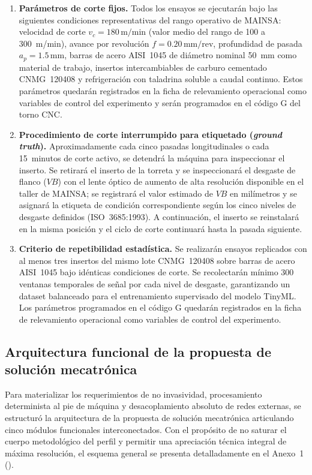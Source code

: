 \begin{enumerate}[leftmargin=0.8cm]
    \item \textbf{Parámetros de corte fijos.} Todos los ensayos se ejecutarán bajo las siguientes condiciones representativas del rango operativo de MAINSA: velocidad de corte $v_c = 180\,\text{m/min}$ (valor medio del rango de 100 a 300~m/min), avance por revolución $f = 0.20\,\text{mm/rev}$, profundidad de pasada $a_p = 1.5\,\text{mm}$, barras de acero AISI~1045 de diámetro nominal 50~mm como material de trabajo, insertos intercambiables de carburo cementado CNMG~120408 y refrigeración con taladrina soluble a caudal continuo. Estos parámetros quedarán registrados en la ficha de relevamiento operacional como variables de control del experimento y serán programados en el código G del torno CNC.

    \item \textbf{Procedimiento de corte interrumpido para etiquetado (\textit{ground truth}).} Aproximadamente cada cinco pasadas longitudinales o cada 15~minutos de corte activo, se detendrá la máquina para inspeccionar el inserto. Se retirará el inserto de la torreta y se inspeccionará el desgaste de flanco ($VB$) con el lente óptico de aumento de alta resolución disponible en el taller de MAINSA; se registrará el valor estimado de $VB$ en milímetros y se asignará la etiqueta de condición correspondiente según los cinco niveles de desgaste definidos (ISO~3685:1993). A continuación, el inserto se reinstalará en la misma posición y el ciclo de corte continuará hasta la pasada siguiente.

    \item \textbf{Criterio de repetibilidad estadística.} Se realizarán ensayos replicados con al menos tres insertos del mismo lote CNMG~120408 sobre barras de acero AISI~1045 bajo idénticas condiciones de corte. Se recolectarán mínimo 300 ventanas temporales de señal por cada nivel de desgaste, garantizando un dataset balanceado para el entrenamiento supervisado del modelo TinyML. Los parámetros programados en el código G quedarán registrados en la ficha de relevamiento operacional como variables de control del experimento.
\end{enumerate}

\subsection{Arquitectura funcional de la propuesta de solución mecatrónica}

Para materializar los requerimientos de no invasividad, procesamiento determinista al pie de máquina y desacoplamiento absoluto de redes externas, se estructuró la arquitectura de la propuesta de solución mecatrónica articulando cinco módulos funcionales interconectados. Con el propósito de no saturar el cuerpo metodológico del perfil y permitir una apreciación técnica integral de máxima resolución, el esquema general se presenta detalladamente en el Anexo~1 ().


